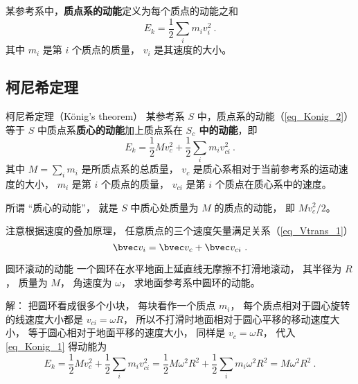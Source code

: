 

某参考系中，\textbf{质点系的动能}定义为每个质点的动能之和
\begin{equation}\label{eq_Konig_2}
E_k = \frac12 \sum_i m_i v_{i}^2 ~.
\end{equation}
其中 $m_i$ 是第 $i$ 个质点的质量， $v_i$ 是其速度的大小。

\subsection{柯尼希定理}

\begin{theorem}{柯尼希定理（König's theorem）}
某参考系 $S$ 中，质点系的动能（\autoref{eq_Konig_2}）等于 $S$ 中质点系\textbf{质心的动能}加上质点系在\textbf{ $S_c$ 中的动能}，即
\begin{equation}\label{eq_Konig_1}
E_k = \frac12 Mv_c^2 + \frac12 \sum_i m_i v_{ci}^2 ~.
\end{equation}
其中 $M=\sum_i m_i$ 是所质点系的总质量， $v_c$ 是质心系相对于当前参考系的运动速度的大小， $m_i$ 是第 $i$ 个质点的质量， $v_{ci}$ 是第 $i$ 个质点在质心系中的速度。

所谓 “质心的动能”， 就是 $S$ 中质心处质量为 $M$ 的质点的动能， 即 $Mv_c^2/2$。
\end{theorem}
注意根据速度的叠加原理， 任意质点的三个速度矢量满足关系（\autoref{eq_Vtrans_1}）
\begin{equation}\label{eq_Konig_3}
\bvec v_i = \bvec v_c + \bvec v_{ci}~.
\end{equation}

\begin{example}{圆环滚动的动能}
一个圆环在水平地面上延直线无摩擦不打滑地滚动， 其半径为 $R$， 质量为 $M$， 角速度为 $\omega$， 求地面参考系中圆环的动能。

解： 把圆环看成很多个小块， 每块看作一个质点 $m_i$， 每个质点相对于圆心旋转的线速度大小都是 $v_{ci} = \omega R$， 所以不打滑时地面相对于圆心平移的移动速度大小， 等于圆心相对于地面平移的速度大小， 同样是 $v_c = \omega R$， 代入\autoref{eq_Konig_1} 得动能为
\begin{equation}
E_k = \frac12 M v_c^2 + \frac12 \sum_i m_i v_{ci}^2 = \frac12 M\omega^2 R^2 + \frac12 \sum_i m_i\omega^2 R^2 = M\omega^2 R^2~.
\end{equation}
\end{example}

